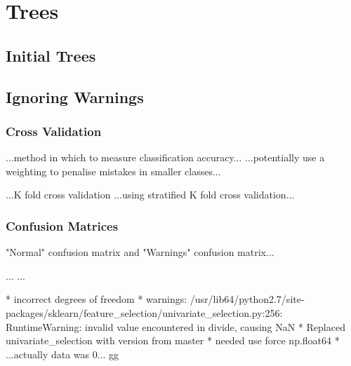 \section{Trees}
\subsection{Initial Trees}

\subsection{Ignoring Warnings}

\subsubsection{Cross Validation}

...method in which to measure classification accuracy...
...potentially use a weighting to penalise mistakes in smaller classes...

...K fold cross validation
...using stratified K fold cross validation...

\subsubsection{Confusion Matrices}
"Normal" confusion matrix and "Warnings" confusion matrix...

...
...

* incorrect degrees of freedom
* warnings: /usr/lib64/python2.7/site-packages/sklearn/feature\_selection/univariate\_selection.py:256: RuntimeWarning: invalid value encountered in divide, causing NaN
* Replaced univariate\_selection with version from master
* needed use force np.float64
* ...actually data was 0... gg

